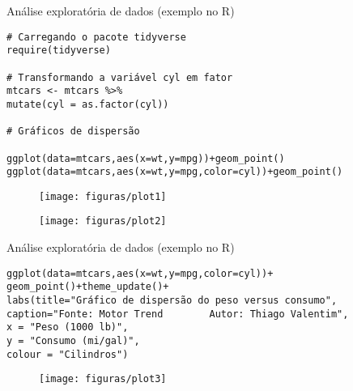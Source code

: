 \documentclass[xcolor=table,t]{beamer}
\begin{document}
\begin{frame}[t, fragile]{Análise exploratória de dados (exemplo no R)}
\vspace{-0.3 cm}
\scriptsize
\begin{verbatim}
# Carregando o pacote tidyverse
require(tidyverse)

# Transformando a variável cyl em fator
mtcars <- mtcars %>% 
mutate(cyl = as.factor(cyl))

# Gráficos de dispersão

ggplot(data=mtcars,aes(x=wt,y=mpg))+geom_point()
ggplot(data=mtcars,aes(x=wt,y=mpg,color=cyl))+geom_point()

\end{verbatim}
\vspace{-0.7 cm}
\begin{figure}[htb]
	\begin{minipage}[t]{.45\textwidth}
		\centering
		\texttt{[image: figuras/plot1]}
	\end{minipage}
	\begin{minipage}[t]{.45\textwidth}
		\centering
		\texttt{[image: figuras/plot2]}
	\end{minipage}  
\end{figure}
\end{frame}

\begin{frame}[t, fragile]{Análise exploratória de dados (exemplo no R)}
\vspace{-0.3 cm}
\scriptsize
\begin{verbatim}
ggplot(data=mtcars,aes(x=wt,y=mpg,color=cyl))+
geom_point()+theme_update()+
labs(title="Gráfico de dispersão do peso versus consumo",
caption="Fonte: Motor Trend        Autor: Thiago Valentim",
x = "Peso (1000 lb)",
y = "Consumo (mi/gal)",
colour = "Cilindros")
\end{verbatim}
\vspace{-0.2 cm}
\begin{figure}[htb]
		\centering
		\texttt{[image: figuras/plot3]}
\end{figure}
\end{frame}
\end{document}

